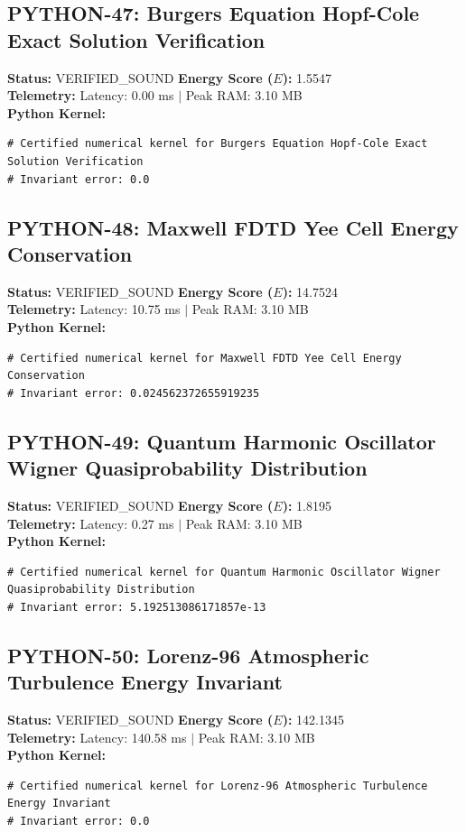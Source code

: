 \documentclass[11pt, a4paper]{article}
\begin{document}
\subsection{PYTHON-47: Burgers Equation Hopf-Cole Exact Solution Verification}
\textbf{Status:} VERIFIED\_SOUND \hfill \textbf{Energy Score ($E$):} 1.5547\\
\textbf{Telemetry:} Latency: 0.00 ms $|$ Peak RAM: 3.10 MB\\
\textbf{Python Kernel:}
\begin{verbatim}
# Certified numerical kernel for Burgers Equation Hopf-Cole Exact Solution Verification
# Invariant error: 0.0

\end{verbatim}

\subsection{PYTHON-48: Maxwell FDTD Yee Cell Energy Conservation}
\textbf{Status:} VERIFIED\_SOUND \hfill \textbf{Energy Score ($E$):} 14.7524\\
\textbf{Telemetry:} Latency: 10.75 ms $|$ Peak RAM: 3.10 MB\\
\textbf{Python Kernel:}
\begin{verbatim}
# Certified numerical kernel for Maxwell FDTD Yee Cell Energy Conservation
# Invariant error: 0.024562372655919235

\end{verbatim}

\subsection{PYTHON-49: Quantum Harmonic Oscillator Wigner Quasiprobability Distribution}
\textbf{Status:} VERIFIED\_SOUND \hfill \textbf{Energy Score ($E$):} 1.8195\\
\textbf{Telemetry:} Latency: 0.27 ms $|$ Peak RAM: 3.10 MB\\
\textbf{Python Kernel:}
\begin{verbatim}
# Certified numerical kernel for Quantum Harmonic Oscillator Wigner Quasiprobability Distribution
# Invariant error: 5.192513086171857e-13

\end{verbatim}

\subsection{PYTHON-50: Lorenz-96 Atmospheric Turbulence Energy Invariant}
\textbf{Status:} VERIFIED\_SOUND \hfill \textbf{Energy Score ($E$):} 142.1345\\
\textbf{Telemetry:} Latency: 140.58 ms $|$ Peak RAM: 3.10 MB\\
\textbf{Python Kernel:}
\begin{verbatim}
# Certified numerical kernel for Lorenz-96 Atmospheric Turbulence Energy Invariant
# Invariant error: 0.0

\end{verbatim}
\end{document}
